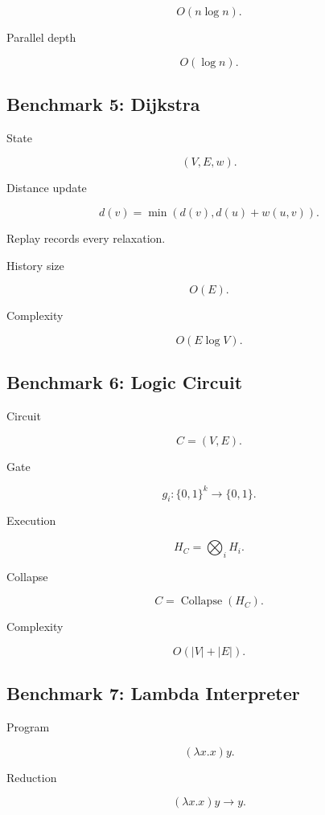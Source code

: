 \documentclass[12pt,oneside]{article}
\theoremstyle{definition}
\theoremstyle{remark}
\begin{document}
\[
O(n\log n).
\]

Parallel depth

\[
O(\log n).
\]

\subsection*{Benchmark 5: Dijkstra}

State

\[
(V,E,w).
\]

Distance update

\[
d(v)
=
\min
(d(v),d(u)+w(u,v)).
\]

Replay records every relaxation.

History size

\[
O(E).
\]

Complexity

\[
O(E\log V).
\]

\subsection*{Benchmark 6: Logic Circuit}

Circuit

\[
C=(V,E).
\]

Gate

\[
g_i
:
\{0,1\}^k
\rightarrow
\{0,1\}.
\]

Execution

\[
H_C
=
\bigotimes_i
H_i.
\]

Collapse

\[
C
=
\operatorname{Collapse}(H_C).
\]

Complexity

\[
O(|V|+|E|).
\]

\subsection*{Benchmark 7: Lambda Interpreter}

Program

\[
(\lambda x.x)y.
\]

Reduction

\[
(\lambda x.x)y
\rightarrow
y.
\]
\end{document}
